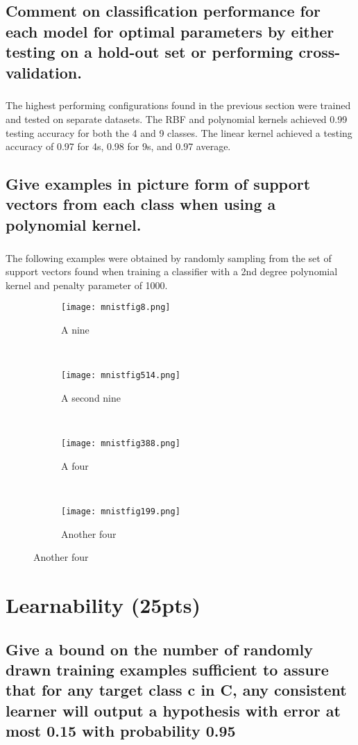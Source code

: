 \documentclass[11pt]{article}
\begin{document}
\subsection{Comment on classification performance for each model for optimal parameters by either testing on a hold-out set or performing cross-validation.}

\subparagraph{}

The highest performing configurations found in the previous section were trained and tested on separate datasets. The RBF and polynomial kernels achieved 0.99 testing accuracy for both the 4 and 9 classes. The linear kernel achieved a testing accuracy of 0.97 for 4s, 0.98 for 9s, and 0.97 average.

\subsection{Give examples in picture form of support vectors from each class when using a polynomial kernel.}

\subparagraph{}

The following examples were obtained by randomly sampling from the set of support vectors found when training a classifier with a 2nd degree polynomial kernel and penalty parameter of 1000.

\begin{figure}[h]
	\centering
	\begin{subfigure}[b]{0.2\linewidth}
		\texttt{[image: mnistfig8.png]}
		\caption{A nine}
	\end{subfigure}
	~
	\begin{subfigure}[b]{0.2\linewidth}
		\texttt{[image: mnistfig514.png]}
		\caption{A second nine}
	\end{subfigure}
	~
	\begin{subfigure}[b]{0.2\linewidth}
		\texttt{[image: mnistfig388.png]}
		\caption{A four}
	\end{subfigure}
	~
	\begin{subfigure}[b]{0.2\linewidth}
		\texttt{[image: mnistfig199.png]}
		\caption{Another four}
	\end{subfigure}
\end{figure}

\section{Learnability (25pts)}

\subsection{Give a bound on the number of randomly drawn training examples sufficient to assure that for any target class c in C, any consistent learner will output a hypothesis with error at most 0.15 with probability 0.95}
\end{document}
